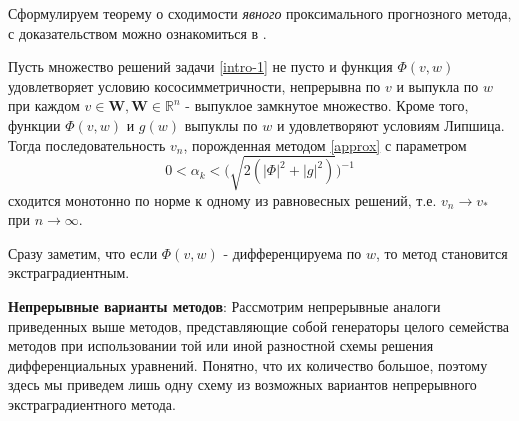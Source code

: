 Сформулируем теорему о сходимости \textit{явного} проксимального прогнозного метода, с доказательством можно ознакомиться в \cite{9}.
\begin{theo}
Пусть множество решений задачи \eqref{intro-1} не пусто и функция $\Phi(v,w)$ удовлетворяет условию кососимметричности, непрерывна по $v$ и выпукла по $w$ при каждом $v\in\mathbf{W},\mathbf{W}\in\mathbb{R}^n$ - выпуклое замкнутое множество. Кроме того, функции $\Phi(v,w)$ и $g(w)$ выпуклы по $w$ и удовлетворяют условиям Липшица. Тогда последовательность $v_n$, порожденная методом \eqref{approx} с параметром 
\begin{equation*}
0<\alpha_k < \big(\sqrt{2(|\Phi|^2+|g|^2)} \big)^{-1}
\end{equation*}
сходится монотонно по норме к одному из равновесных решений, т.е. $v_n\to v_*$ при $n\to \infty$.
\end{theo}
Сразу заметим, что если $\Phi(v,w)$ - дифференцируема по $w$, то метод становится экстраградиентным. 

\textbf{Непрерывные варианты методов}: Рассмотрим непрерывные аналоги приведенных выше методов, представляющие собой генераторы целого семейства методов при использовании той или иной разностной схемы решения дифференциальных уравнений. Понятно, что их количество большое, поэтому здесь мы приведем лишь одну схему из возможных вариантов непрерывного экстраградиентного метода. 


